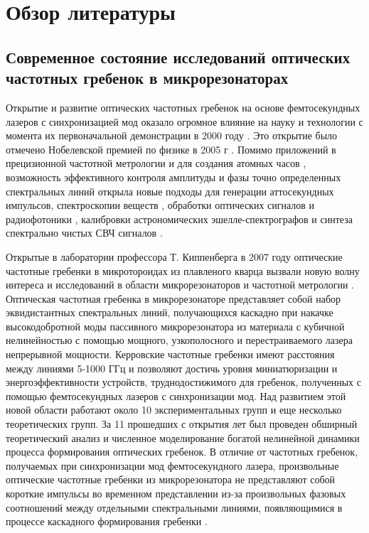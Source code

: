 \chapter{Обзор литературы} \label{chapt1}

\section{Современное состояние исследований оптических частотных гребенок в микрорезонаторах} \label{sect1_1}

Открытие и развитие оптических частотных гребенок на основе фемтосекундных лазеров с синхронизацией мод оказало огромное влияние на науку и технологии с момента их первоначальной демонстрации в 2000 году \cite{Jones635,PhysRevLett.84.5102}. Это открытие было отмечено Нобелевской премией по физике в 2005 г \cite{Hall2006}. Помимо приложений в прецизионной частотной метрологии и для создания атомных часов \cite{Diddams2001,Udem2002,Ye2005,Diddams2004}, возможность эффективного контроля амплитуды и фазы точно определенных спектральных линий открыла новые подходы для генерации аттосекундных импульсов, спектроскопии веществ \cite{Stowe2008,Diddams2007,Ideguchi2013,Holzwarth2000}, обработки оптических сигналов и радиофотоники \cite{Gao2006,Torres2014}, калибровки астрономических эшелле-спектрографов \cite{Steinmetz2008} и синтеза спектрально чистых СВЧ сигналов \cite{Fortier2011}.

Открытые в лаборатории профессора Т. Киппенберга в 2007 году оптические частотные гребенки в микротороидах из плавленого кварца \cite{DelHaye2007} вызвали новую волну интереса и исследований в области микрорезонаторов и частотной метрологии \cite{Kippenberg2011}. Оптическая частотная гребенка в микрорезонаторе представляет собой набор эквидистантных спектральных линий, получающихся каскадно при накачке высокодобротной моды пассивного микрорезонатора из материала с кубичной нелинейностью с помощью мощного, узкополосного и перестраиваемого лазера непрерывной мощности. Керровские частотные гребенки имеют расстояния между линиями 5-1000 ГГц и позволяют достичь уровня миниатюризации и энергоэффективности устройств, труднодостижимого для гребенок, полученных с помощью фемтосекундных лазеров с синхронизации мод. Над развитием этой новой области работают около 10 экспериментальных групп и еще несколько теоретических групп. За 11 прошедших с открытия лет был проведен обширный теоретический анализ и численное моделирование богатой нелинейной динамики процесса формирования оптических гребенок. В отличие от частотных гребенок, получаемых при синхронизации мод фемтосекундного лазера, произвольные оптические частотные гребенки из микрорезонатора не представляют собой короткие импульсы во временном представлении из-за произвольных фазовых соотношений между отдельными спектральными линиями, появляющимися в процессе каскадного формирования гребенки \cite{Herr2012}.

